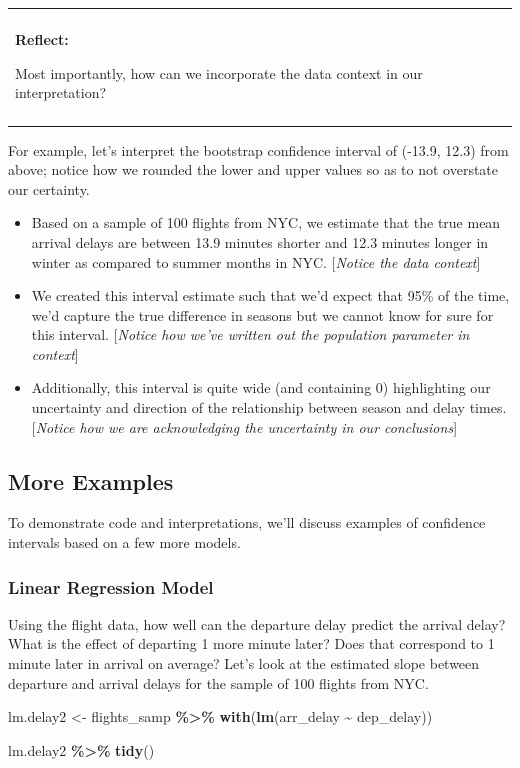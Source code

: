 \documentclass[
]{book}
\newenvironment{Shaded}{\begin{snugshade}}{\end{snugshade}}
\newcommand{\FunctionTok}[1]{\textcolor[rgb]{0.13,0.29,0.53}{\textbf{#1}}}
\newcommand{\NormalTok}[1]{#1}
\newcommand{\OtherTok}[1]{\textcolor[rgb]{0.56,0.35,0.01}{#1}}
\newcommand{\SpecialCharTok}[1]{\textcolor[rgb]{0.81,0.36,0.00}{\textbf{#1}}}
\providecommand{\tightlist}{%
  \setlength{\itemsep}{0pt}\setlength{\parskip}{0pt}}
\newenvironment{reflect}
{
    \begin{center}
    
    \begin{tabular}{|p{0.8\textwidth}|}
    \rowcolor{LightBlue}
    \hline\\
    \rowcolor{LightBlue}
    \textbf{Reflect:}
}
{
    \\\rowcolor{LightBlue}
    \\\hline
    \end{tabular} 
    \end{center}
}
\begin{document}
\begin{reflect}
Most importantly, how can we incorporate the data context in our
interpretation?
\end{reflect}

For example, let's interpret the bootstrap confidence interval of (-13.9, 12.3) from above; notice how we rounded the lower and upper values so as to not overstate our certainty.

\begin{itemize}
\tightlist
\item
  Based on a sample of 100 flights from NYC, we estimate that the true mean arrival delays are between 13.9 minutes shorter and 12.3 minutes longer in winter as compared to summer months in NYC. {[}\emph{Notice the data context}{]}
\item
  We created this interval estimate such that we'd expect that 95\% of the time, we'd capture the true difference in seasons but we cannot know for sure for this interval. {[}\emph{Notice how we've written out the population parameter in context}{]}
\item
  Additionally, this interval is quite wide (and containing 0) highlighting our uncertainty and direction of the relationship between season and delay times. {[}\emph{Notice how we are acknowledging the uncertainty in our conclusions}{]}
\end{itemize}

\subsection{More Examples}\label{more-examples}

To demonstrate code and interpretations, we'll discuss examples of confidence intervals based on a few more models.

\subsubsection{Linear Regression Model}\label{linear-regression-model}

Using the flight data, how well can the departure delay predict the arrival delay? What is the effect of departing 1 more minute later? Does that correspond to 1 minute later in arrival on average? Let's look at the estimated slope between departure and arrival delays for the sample of 100 flights from NYC.

\begin{Shaded}
\begin{Highlighting}[]
\NormalTok{lm.delay2 }\OtherTok{\textless{}{-}}\NormalTok{ flights\_samp }\SpecialCharTok{\%\textgreater{}\%}
  \FunctionTok{with}\NormalTok{(}\FunctionTok{lm}\NormalTok{(arr\_delay }\SpecialCharTok{\textasciitilde{}}\NormalTok{ dep\_delay))}
       
\NormalTok{lm.delay2 }\SpecialCharTok{\%\textgreater{}\%} 
  \FunctionTok{tidy}\NormalTok{()}
\end{Highlighting}
\end{Shaded}
\end{document}
